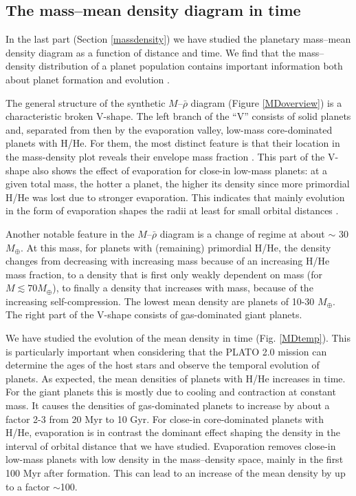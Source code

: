 \documentclass[]{emulateapj}
\begin{document}
{\subsection{The mass--mean density diagram in time}}
In the last part (Section \ref{massdensity}) we have studied the planetary mass--mean density diagram as a function of distance and time. We find that the mass--density distribution of a planet population contains  important information both about planet formation and evolution  \citep{Rauer2013,HatzesRauer2015,Baruteau2016}.

{T}he general structure of the synthetic $M$--$\bar{\rho}$ diagram (Figure \ref{MDoverview}) {is a characteristic broken} V-shape. The left branch of the ``V'' {consists of solid planets and, separated from then by the evaporation valley,} low-mass core-dominated planets with H/He. For them, the most distinct feature is that their location in the mass-density plot reveals their envelope mass fraction \citep{Lopez2014}. This part of the V-shape also shows the effect of evaporation for close-in low-mass planets: at a given total mass, the hotter a planet, the higher its density since more primordial H/He was lost due to stronger evaporation. This indicates that mainly evolution in the form of evaporation shapes the radii at least for small orbital distances \citep{Owen2013}. 

Another notable feature in the $M$--$\bar{\rho}$ diagram is a change of regime at about $\sim$ 30 $M_{\oplus}$. At this mass, for planets with (remaining) primordial H/He, the density changes from decreasing with increasing mass because of an increasing H/He mass fraction, to a density that is first only weakly dependent on mass (for $M\lesssim 70 M_\oplus$), to finally a density that  increases with mass, because of the increasing self-compression. The lowest mean density are planets of 10-30 $M_{\oplus}$. The right part of the V-shape consists of gas-dominated giant planets.

We have studied the evolution of the mean density in time (Fig. \ref{MDtemp}). This is particularly important when considering that the  PLATO 2.0 mission can  determine the ages of the host stars and observe the temporal evolution of planets. As expected, the mean densities of  planets with H/He increases in time. For the giant planets this is mostly due to cooling and contraction at constant mass. It causes the densities of gas-dominated planets to increase by about a factor 2-3 from 20 Myr to 10 Gyr.  For close-in core-dominated planets with H/He, evaporation is in contrast the dominant effect shaping the density in the interval of orbital distance that we have studied. Evaporation removes close-in low-mass  planets with low density in the mass--density space, mainly in the first 100 Myr after formation.  This can lead to an increase of the mean density by up to a factor $\sim$100.
\end{document}
